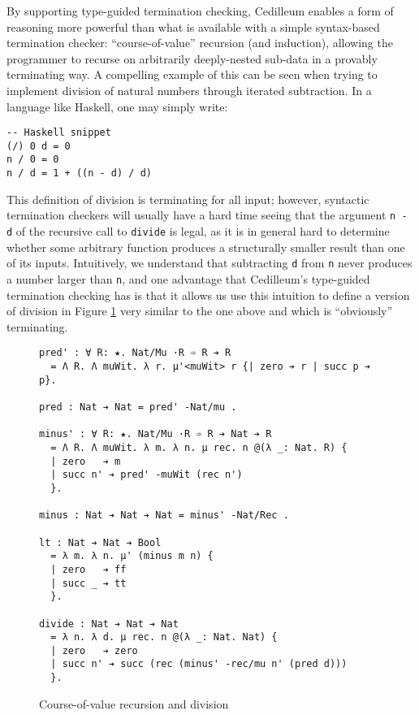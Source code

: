 \documentclass{article}
\begin{document}
By supporting type-guided termination checking, Cedilleum enables a form of
reasoning more powerful than what is available with a simple
syntax-based termination checker: ``course-of-value'' recursion (and induction),
allowing the programmer to recurse on arbitrarily deeply-nested sub-data in a
provably terminating way. A compelling example of this can be seen when trying
to implement division of natural numbers through iterated subtraction. In a
language like Haskell, one may simply write:
\begin{verbatim}
-- Haskell snippet
(/) 0 d = 0
n / 0 = 0
n / d = 1 + ((n - d) / d)
\end{verbatim}
This definition of division is terminating for all input; however, syntactic
termination checkers will usually have a hard time seeing that the argument
\texttt{n - d} of the recursive call to \texttt{divide} is legal, as it is in
general hard to determine whether some arbitrary function produces a
structurally smaller result than one of its inputs. Intuitively, we understand
that subtracting \texttt{d} from \texttt{n} never produces a number larger than
\texttt{n}, and one advantage that Cedilleum's type-guided termination checking
has is that it allows us use this intuition to define a version of division in
Figure \ref{fig:ex-data-div} very similar to the one above and which is
``obviously'' terminating.

\label{sec:hist-rec}
\begin{figure}[h]
\begin{verbatim}
pred' : ∀ R: ★. Nat/Mu ·R ➾ R ➔ R
  = Λ R. Λ muWit. λ r. μ'<muWit> r {| zero ➔ r | succ p ➔ p}.

pred : Nat ➔ Nat = pred' -Nat/mu .

minus' : ∀ R: ★. Nat/Mu ·R ➾ R ➔ Nat ➔ R
  = Λ R. Λ muWit. λ m. λ n. μ rec. n @(λ _: Nat. R) {
  | zero   ➔ m
  | succ n' ➔ pred' -muWit (rec n')
  }.

minus : Nat ➔ Nat ➔ Nat = minus' -Nat/Rec .

lt : Nat ➔ Nat ➔ Bool
  = λ m. λ n. μ' (minus m n) {
  | zero   ➔ ff
  | succ _ ➔ tt
  }.

divide : Nat ➔ Nat ➔ Nat
  = λ n. λ d. μ rec. n @(λ _: Nat. Nat) {
  | zero   ➔ zero
  | succ n' ➔ succ (rec (minus' -rec/mu n' (pred d)))
  }.
\end{verbatim}
  \caption{Course-of-value recursion and division}
  \label{fig:ex-data-div}
\end{figure}
\end{document}
